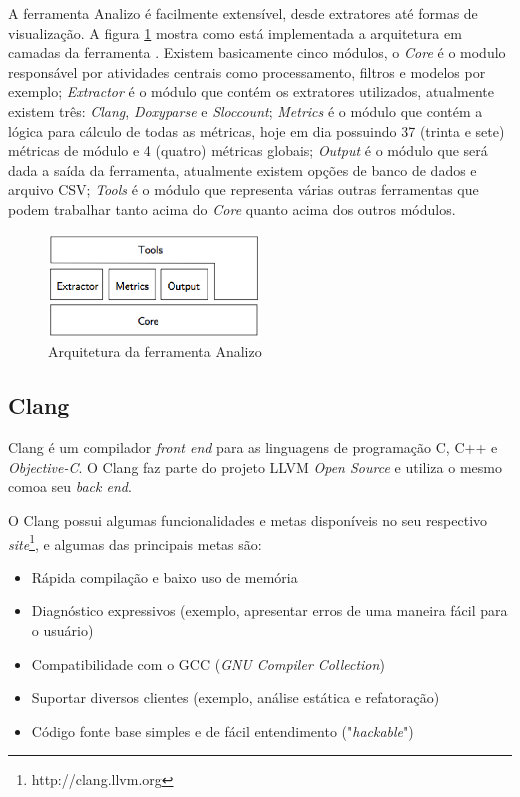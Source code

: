 A ferramenta Analizo é facilmente extensível, desde extratores até formas de visualização. A figura \ref{archanalizo} mostra
como está implementada a arquitetura em camadas da ferramenta \cite{analizoartigo}. Existem basicamente cinco módulos, o 
\textit{Core} é o modulo responsável por atividades centrais como processamento, filtros e modelos por exemplo; 
\textit{Extractor} é o módulo que contém os extratores utilizados, atualmente existem três: \textit{Clang}, \textit{Doxyparse}
e \textit{Sloccount}; \textit{Metrics} é o módulo que contém a lógica para cálculo de todas as métricas, hoje em dia possuindo
37 (trinta e sete) métricas de módulo e 4 (quatro) métricas globais; \textit{Output} é o módulo que será dada a saída da 
ferramenta, atualmente existem opções de banco de dados e arquivo CSV; \textit{Tools} é o módulo que representa várias outras
ferramentas que podem trabalhar tanto acima do \textit{Core} quanto acima dos outros módulos.

\begin{figure}[h]
  \centering
  \includegraphics[width=0.5\textwidth]
      {figuras/analizo.eps}
  \caption{Arquitetura da ferramenta Analizo}
  \label{archanalizo}
\end{figure}

\subsection{Clang} \label{clang}

Clang é um compilador \textit{front end} para as linguagens de programação C, C++ e \textit{Objective-C}. O Clang faz parte
do projeto LLVM \textit{Open Source} e utiliza o mesmo comoa seu \textit{back end}. 

O Clang possui algumas funcionalidades e metas disponíveis no seu respectivo \textit{site}\footnote{http://clang.llvm.org}, e
algumas das principais metas são:

\begin{itemize}
  \item Rápida compilação e baixo uso de memória
  \item Diagnóstico expressivos (exemplo, apresentar erros de uma maneira fácil para o usuário)
  \item Compatibilidade com o GCC (\textit{GNU Compiler Collection})
  \item Suportar diversos clientes (exemplo, análise estática e refatoração)
  \item Código fonte base simples e de fácil entendimento ("\textit{hackable}")
\end{itemize}

